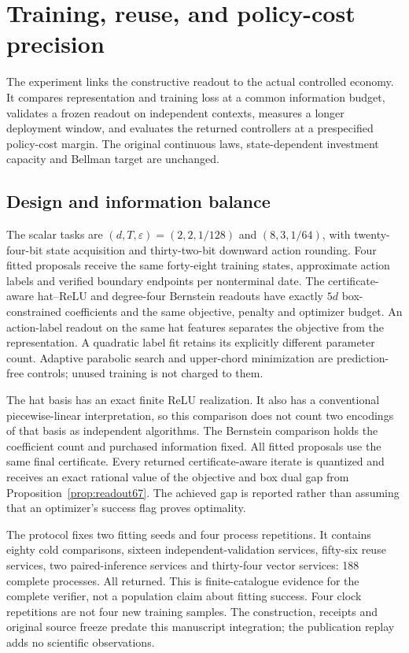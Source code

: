 \section{Training, reuse, and policy-cost precision}\label{sec:study70}
The experiment links the constructive readout to the actual controlled economy. It compares representation and training loss at a common information budget, validates a frozen readout on independent contexts, measures a longer deployment window, and evaluates the returned controllers at a prespecified policy-cost margin. The original continuous laws, state-dependent investment capacity and Bellman target are unchanged.

\subsection{Design and information balance}
The scalar tasks are $(d,T,\varepsilon)=(2,2,1/128)$ and $(8,3,1/64)$, with twenty-four-bit state acquisition and thirty-two-bit downward action rounding. Four fitted proposals receive the same forty-eight training states, approximate action labels and verified boundary endpoints per nonterminal date. The certificate-aware hat--ReLU and degree-four Bernstein readouts have exactly $5d$ box-constrained coefficients and the same objective, penalty and optimizer budget. An action-label readout on the same hat features separates the objective from the representation. A quadratic label fit retains its explicitly different parameter count. Adaptive parabolic search and upper-chord minimization are prediction-free controls; unused training is not charged to them.

The hat basis has an exact finite ReLU realization. It also has a conventional piecewise-linear interpretation, so this comparison does not count two encodings of that basis as independent algorithms. The Bernstein comparison holds the coefficient count and purchased information fixed. All fitted proposals use the same final certificate. Every returned certificate-aware iterate is quantized and receives an exact rational value of the objective and box dual gap from Proposition~\ref{prop:readout67}. The achieved gap is reported rather than assuming that an optimizer's success flag proves optimality.

The protocol fixes two fitting seeds and four process repetitions. It contains eighty cold comparisons, sixteen independent-validation services, fifty-six reuse services, two paired-inference services and thirty-four vector services: 188 complete processes. All returned. This is finite-catalogue evidence for the complete verifier, not a population claim about fitting success. Four clock repetitions are not four new training samples. The construction, receipts and original source freeze predate this manuscript integration; the publication replay adds no scientific observations.

